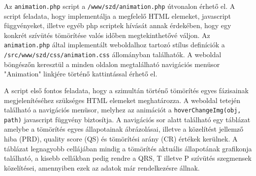 \documentclass[oneside,titlepage,12pt,a4paper]{report}
\begin{document}
Az \texttt{animation.php} script a \texttt{/www/szd/animation.php} útvonalon érhető el. A script feladata, hogy implementálja a megfelelő HTML elemeket, javascript függvényeket, illetve egyéb php scriptek hívását annak érdekében, hogy egy konkrét szívütés tömörítése valós időben megtekinthetővé váljon. Az \texttt{animation.php} által implementált weboldalhoz tartozó stílus definíciók a \texttt{/src/www/szd/css/animation.css} állományban találhatók. A weboldal böngészőn keresztül a minden oldalon megtalálható navigációs menüsor "Animation" linkjére történő kattintással érhető el.
\par A script első fontos feladata, hogy a szimultán történő tömörítés egyes fázisainak megjelenítéséhez szükséges HTML elemeket meghatározza. A weboldal tetején található a navigációs menüsor, melyhez az animációt a  \texttt{hoverChangeImg(obj, path)} javascript függvény biztosítja. A navigációs sor alatt található egy táblázat amelybe a tömörítés egyes állapotainak ábrázolásai, illetve a közelítést jellemző hiba (PRD), quality score (QS) és tömörítési arány (CR) értékek kerülnek. A táblázat legnagyobb cellájában mindig a tömörítés aktuális állapotának grafikonja található, a kisebb cellákban pedig rendre a QRS, T illetve P szívütés szegmensek közelítései, amennyiben ezek az adatok már rendelkezésre állnak. 
\end{document}

